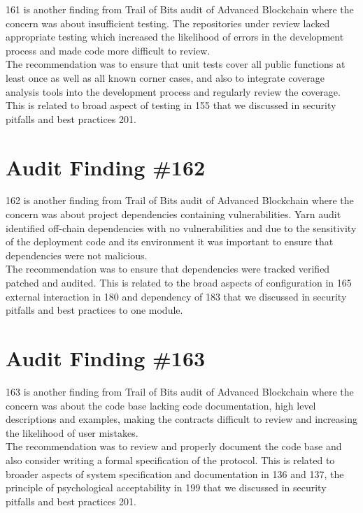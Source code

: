 161 is another finding from Trail of Bits audit of Advanced Blockchain where the concern was about insufficient testing. The repositories under review lacked appropriate testing which increased the likelihood of errors in the development process and made code more difficult to review.\\

The recommendation was to ensure that unit tests cover all public functions at least once as well as all known corner cases, and also to integrate coverage analysis tools into the development process and regularly review the coverage. This is related to broad aspect of testing in 155 that we discussed in security pitfalls and best practices 201.

\section{Audit Finding \#162}

162 is another finding from Trail of Bits audit of Advanced Blockchain where the concern was about project dependencies containing vulnerabilities. Yarn audit identified off-chain dependencies with no vulnerabilities and due to the sensitivity of the deployment code and its environment it was important to ensure that dependencies were not malicious.\\

The recommendation was to ensure that dependencies were tracked verified patched and audited. This is related to the broad aspects of configuration in 165 external interaction in 180 and dependency of 183 that we discussed in security pitfalls and best practices to one module.

\section{Audit Finding \#163}

163 is another finding from Trail of Bits audit of Advanced Blockchain where the concern was about the code base lacking code documentation, high level descriptions and examples, making the contracts difficult to review and increasing the likelihood of user mistakes.\\

The recommendation was to review and properly document the code base and also consider writing a formal specification of the protocol. This is related to broader aspects of system specification and documentation in 136 and 137, the principle of psychological acceptability in 199 that we discussed in security pitfalls and best practices 201.

